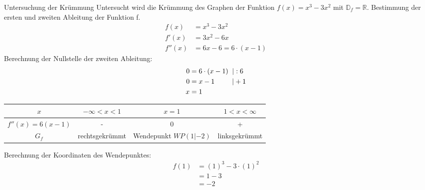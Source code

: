 \begin{bsp}{Untersuchung der Krümmung}{}
Untersucht wird die Krümmung des Graphen der Funktion $f(x) = x^3 -3x^2$ mit $\mathds{D}_f = \mathds{R}$. Bestimmung der ersten und zweiten Ableitung der Funktion f.
\begin{equation*}
    \begin{split}
        f(x) &= x^3 -3x^2\\
        f'(x) &= 3x^2 -6x\\
        f''(x) &= 6x -6 = 6\cdot(x-1)
    \end{split}
\end{equation*}
Berechnung der Nullstelle der zweiten Ableitung:
\begin{equation*}
    \begin{split}
        0 &= 6\cdot(x-1) \hspace{0.2cm} | : 6\\
        0 &= x-1\hspace{0.9cm} | + 1\\
        x &= 1 
    \end{split}
\end{equation*}
\begin{center}\begin{tabular}{||c|c|c|c||}
    \hline
    $x$& $ -\infty <x<1$ & $x = 1$ & $ 1<x<\infty$ \\
    \hline \hline
    $f''(x)=6(x-1)$ & - & 0 & +\\
    \hline
    $G_f$ & rechtsgekrümmt & Wendepunkt $WP(1|-2)$ & linksgekrümmt\\
    \hline
    \hline
\end{tabular}
\end{center}
Berechnung der Koordinaten des Wendepunktes:
\begin{equation*}
    \begin{split}
        f(1) &= (1)^3 -3\cdot (1)^2\\
         &= 1 - 3 \\
         &= -2 
    \end{split}
\end{equation*}
\begin{center}
\end{center}
\end{bsp}
